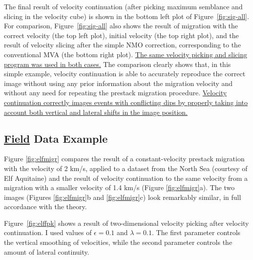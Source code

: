 The final result of velocity continuation (after picking maximum semblance and
slicing in the velocity cube) is shown in the bottom left plot of
Figure~\ref{fig:sig-all}. For comparison, Figure~\ref{fig:sig-all} also shows
the result of migration with the correct velocity (the top left plot), initial
velocity (the top right plot), and the result of velocity slicing after the
simple NMO correction, corresponding to the conventional MVA (the bottom right
plot). \uline{The same velocity picking and slicing program was used in both cases.}
The comparison clearly shows that, in this simple example, velocity
continuation is able to accurately reproduce the correct image without using
any prior information about the migration velocity and without any need for
repeating the prestack migration procedure. \uline{Velocity continuation correctly
images events with conflicting dips by properly taking into account both
vertical and lateral shifts in the image position.}


\subsection{\uline{Field} Data Example}

Figure \ref{fig:elfmigr} compares the result of a constant-velocity prestack
migration with the velocity of 2 km/s, applied to a dataset from the North Sea
(courtesy of Elf Aquitaine) and the result of velocity continuation to the
same velocity from a migration with a smaller velocity of 1.4 km/s (Figure
\ref{fig:elfmigr}a). The two images (Figures \ref{fig:elfmigr}b and
\ref{fig:elfmigr}c) look remarkably similar, in full accordance with the
theory.


Figure~\ref{fig:elffpk} shows a result of two-dimensional velocity
picking after velocity continuation. I used values of $\epsilon=0.1$
and $\lambda=0.1$. The first parameter controls the vertical smoothing
of velocities, while the second parameter controls the amount of
lateral continuity.

